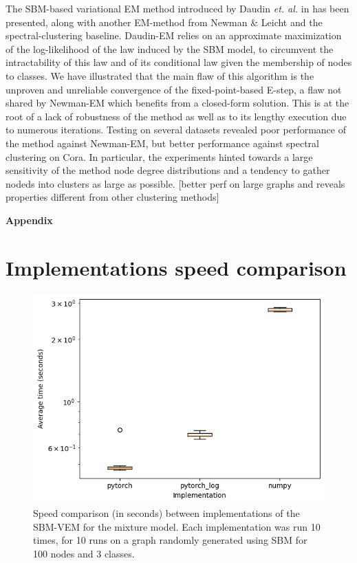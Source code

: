 \documentclass[switch, 12pt]{article}
\begin{document}
\begin{multicols}{2}
    The SBM-based variational EM method introduced by Daudin \textit{et. al.} in \cite{main_article} has been presented, along with another EM-method from Newman \& Leicht \cite{newman} and the spectral-clustering baseline. Daudin-EM relies on an approximate maximization of the log-likelihood of the law induced by the SBM model, to circumvent the intractability of this law and of its conditional law given the membership of nodes to classes. We have illustrated that the main flaw of this algorithm is the unproven and unreliable convergence of the fixed-point-based E-step, a flaw not shared by Newman-EM which benefits from a closed-form solution. This is at the root of a lack of robustness of the method as well as to its lengthy execution due to numerous iterations. Testing on several datasets revealed poor performance of the method against Newman-EM, but better performance against spectral clustering on Cora. In particular, the experiments hinted towards a large sensitivity of the method node degree distributions and a tendency to gather nodeds into clusters as large as possible. [better perf on large graphs and reveals properties different from other clustering methods]


    \newpage

    

\end{multicols}

\newpage


\appendix

\begin{center}
    {\Huge \bfseries Appendix} \\[0.5cm]
\end{center}

\section{Implementations speed comparison}
\label{app:speed_comparison}

\begin{figure}[h]
    \centering
    \includegraphics[width=0.5\linewidth]{figures/speed_comparison_VEM.png}
    \caption{Speed comparison (in seconds) between implementations of the SBM-VEM for the mixture model. Each implementation was run 10 times, for 10 runs on a graph randomly generated using SBM for 100 nodes and 3 classes.}
    \label{fig:speed_comparison}
\end{figure}
\end{document}
